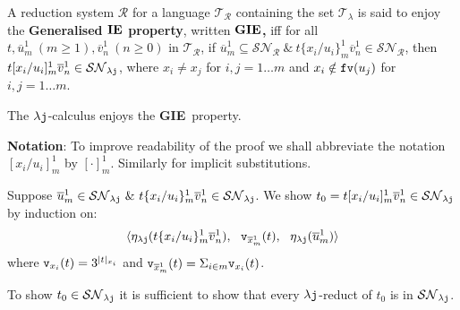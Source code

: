 \documentclass{LMCS}
\renewcommand{\>}{\rightarrow}
\def\lam{\lambda}
\newcommand{\SN}[1]{\mathcal{SN}_{#1}}
\newcommand{\ttv}{{\tt v}}
\newcommand{\R}{\mathcal{R}}
\newcommand{\dis}{{\tt j}}
\newcommand{\ldis}{\lam{\dis}}
\newcommand{\fv}[1]{{\tt fv}(#1)}
\newcommand{\terms}{\mathcal{T}}
\newcommand{\termslambda}{\terms_{\lam}}
\newcommand{\fo}[2]{\ttv_{#2}(#1)}
\newcommand{\deft}[1]{{\bf #1}}
\newcommand{\iep}{{\bf IE}}
\newcommand{\giep}{{\bf GIE}}
\renewcommand{\sp}[4]{\{#1_{i}/#2_{i}\}^{#3}_{#4}}
\newcommand{\esp}[4]{[{#1}_i/{#2}_i]^{#3}_{#4}}
\newcommand{\ovl}[3]{\overline{#1}^{#2}_{#3}}
\newcommand{\espp}[4]{[\cdot]^{#3}_{#4}}
\begin{document}
A reduction system $\R$ for a language $\terms_{\R}$ containing
  the set $\termslambda$ is said to enjoy the \deft{Generalised $\iep$ property}, written \deft{$\giep$, } iff for
  all $t, \ovl{u}{1}{m}\ (m \geq 1), \ovl{v}{1}{n}\ (n \geq 0)$ in
  $\terms_{\R}$, if $\ovl{u}{1}{m} \subseteq
  \SN{\R}\ \&\ t\sp{x}{u}{1}{m} \ovl{v}{1}{n}
 \in \SN{\R}$, then
  $t\esp{x}{u}{1}{m} \ovl{v}{1}{n} \in \SN{\ldis}$, where $x_i \neq
  x_j$ for $i,j=1\ldots m$ and $x_i \notin \fv{u_j}$ for $i,j=1\ldots  m$.  


\begin{thm}[$\giep$ for $\ldis$]
\label{t:ieg}
The $\ldis$-calculus enjoys the \giep\ property.
\end{thm}


\textbf{Notation}: To improve readability of the proof we shall
abbreviate the notation $\esp{x}{u}{1}{m}$ by $\espp{x}{u}{1}{m}$. Similarly for implicit substitutions.


\proof 
Suppose $\ovl{u}{1}{m} \in    \SN{\ldis}\ \&\ 
             t\sp{x}{u}{1}{m} \ovl{v}{1}{n}  \in    \SN{\ldis}$.
We show $t_0= t \esp{x}{u}{1}{m} \ovl{v}{1}{n}\in    \SN{\ldis}$ by
induction on:
$$\langle \eta_{\ldis}(t\sp{x}{u}{1}{m} \ovl{v}{1}{n}),\ \ 
\fo{t}{\ovl{x}{1}{m}},\ \   \eta_{\ldis}(\ovl{u}{1}{m})  \rangle$$
where
$\fo{t}{x_i} = 3^{|t|_{x_i}}$ and 
 $\fo{t}{\ovl{x}{1}{m}} = \Sigma_{i \in m} \fo{t}{x_i}$.

To show $t_0  \in \SN{\ldis}$ it is sufficient to show that
every $\ldis$-reduct of $t_0$ is in $\SN{\ldis}$. 
\end{document}
